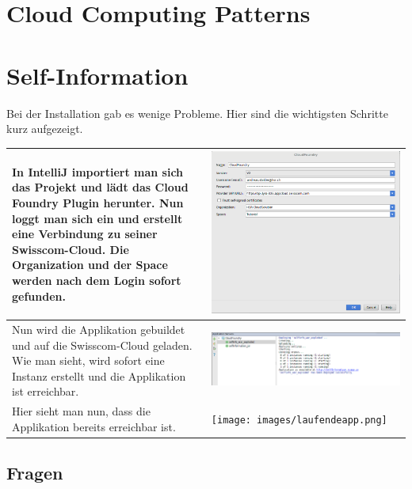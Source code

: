 \chapter{Cloud Computing Patterns}
\chapter{Self-Information}
Bei der Installation gab es wenige Probleme. Hier sind die wichtigsten Schritte kurz aufgezeigt.
\begin{longtable}{| p{5cm} | p{11cm} |}
\hline
In IntelliJ importiert man sich das Projekt und lädt das Cloud Foundry Plugin herunter. Nun loggt man sich ein und erstellt eine Verbindung zu seiner Swisscom-Cloud. Die Organization und der Space werden nach dem Login sofort gefunden.
&\includegraphics[width=0.65\columnwidth, valign=T]{images/cloudfoundryplugin.png}\\ \hline

Nun wird die Applikation gebuildet und auf die Swisscom-Cloud geladen. Wie man sieht, wird sofort eine Instanz erstellt und die Applikation ist erreichbar.
&\includegraphics[width=0.65\columnwidth, valign=T]{images/instanzen.png}\\ \hline


Hier sieht man nun, dass die Applikation bereits erreichbar ist.
&\texttt{[image: images/laufendeapp.png]}\\ \hline
\end{longtable}
\section{Fragen}
